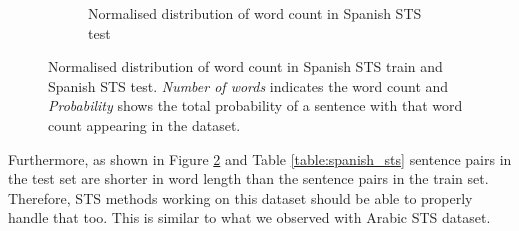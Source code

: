 \begin{enumerate}
\begin{figure}
\begin{subfigure}[b]{.5\textwidth}
		\caption{Normalised distribution of word count in Spanish STS test}
		\label{fig:spanish_sts_test_words}
	\end{subfigure}
	\caption[Normalised distribution of word count in Spanish STS train and Spanish STS test.]{Normalised distribution of word count in Spanish STS train and Spanish STS test. \textit{Number of words} indicates the word count and \textit{Probability} shows the total probability of a sentence with that word count appearing in the dataset.}
	\label{fig:spanish_sts_words}
\end{figure}

Furthermore, as shown in Figure \ref{fig:spanish_sts_words} and Table \ref{table:spanish_sts} sentence pairs in the test set are shorter in word length than the sentence pairs in the train set. Therefore, STS methods working on this dataset should be able to properly handle that too. This is similar to what we observed with Arabic STS dataset.





\end{enumerate}
